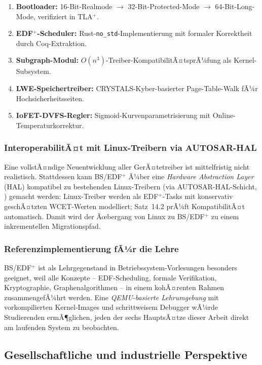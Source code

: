 ﻿\documentclass[a4paper,12pt]{scrreprt}
\theoremstyle{definition}
\begin{document}
	\begin{enumerate}
		\item \textbf{Bootloader:} 16-Bit-Realmode $\to$ 32-Bit-Protected-Mode
		$\to$ 64-Bit-Long-Mode, verifiziert in TLA$^+$.
		\item \textbf{EDF$^+$-Scheduler:} Rust-\texttt{no\_std}-Implementierung
		mit formaler Korrektheit durch Coq-Extraktion.
		\item \textbf{Subgraph-Modul:} $O(n^3)$-Treiber-KompatibilitÃ¤tsprÃ¼fung
		als Kernel-Subsystem.
		\item \textbf{LWE-Speichertreiber:} CRYSTALS-Kyber-basierter
		Page-Table-Walk fÃ¼r Hochsicherheitsseiten.
		\item \textbf{IoFET-DVFS-Regler:} Sigmoid-Kurvenparametrisierung
		mit Online-Temperatur\-korrektur.
	\end{enumerate}
	
	\subsubsection{InteroperabilitÃ¤t mit Linux-Treibern via AUTOSAR-HAL}
	
	Eine vollstÃ¤ndige Neuentwicklung aller GerÃ¤tetreiber ist
	mittelfristig nicht realistisch. Stattdessen kann BS/EDF$^+$
	Ã¼ber eine \emph{Hardware Abstraction Layer} (HAL) kompatibel
	zu bestehenden Linux-Treibern (via AUTOSAR-HAL-Schicht,
	\cite{Epp2026autsrepy}) gemacht werden: Linux-Treiber werden
	als EDF$^+$-Tasks mit konservativ geschÃ¤tzten WCET-Werten
	modelliert; Satz~14.2 prÃ¼ft KompatibilitÃ¤t automatisch.
	Damit wird der Ãœbergang von Linux zu BS/EDF$^+$ zu einem
	inkrementellen Migrationspfad.
	
	\subsubsection{Referenzimplementierung fÃ¼r die Lehre}
	
	BS/EDF$^+$ ist als Lehrgegenstand in Betriebssystem-Vorlesungen
	besonders geeignet, weil alle Konzepte -- EDF-Scheduling,
	formale Verifikation, Kryptographie, Graphenalgorithmen --
	in einem kohÃ¤renten Rahmen zusammengefÃ¼hrt werden.
	Eine \emph{QEMU-basierte Lehrumgebung} mit vorkompilierten
	Kernel-Images und schrittweisem Debugger wÃ¼rde Studierenden
	ermÃ¶glichen, jeden der sechs HauptsÃ¤tze dieser Arbeit
	direkt am laufenden System zu beobachten.
	
	\subsection{Gesellschaftliche und industrielle Perspektive}
	
\end{document}
